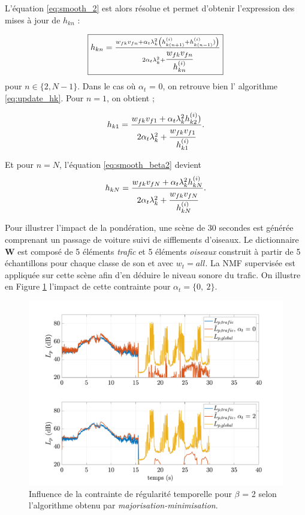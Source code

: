 L'équation \ref{eq:smooth_2} est alors résolue et permet d'obtenir l'expression des mises à jour de $h_{kn}$ : 

\begin{equation}\label{eq:smooth_beta2}
\fbox{$
h_{kn} = \frac{w_{fk} v_{fn}+\alpha_t  \lambda_k^2 \left(h_{k(n+1)}^{(i)}+h_{k(n-1)}^{(i)})\right)}{2\alpha_t \lambda_k^2 + \cfrac{w_{fk} v_{fn}} {h_{kn}^{(i)}}}$}
\end{equation}
pour $n \in \lbrace 2, N-1 \rbrace$. Dans le cas où $\alpha_t$ = 0, on retrouve bien l' algorithme \ref{eq:update_hk}. Pour $n = 1$, on obtient ; 

\begin{equation}
h_{k1} = \frac{w_{fk} v_{f1}+\alpha_t \lambda_k^2 h_{k2}^{(i)})}{2\alpha_t \lambda_k^2 + \cfrac{w_{fk} v_{f1}}{h_{k1}^{(i)}}}.
\end{equation}

Et pour $n = N$, l'équation \ref{eq:smooth_beta2} devient 
\begin{equation}
h_{kN} = \frac{w_{fk} v_{fN}+\alpha_t  \lambda_k^2 h_{kN}^{(i)}}{2\alpha_t \lambda_k^2 + \cfrac{w_{fk} v_{fN}} {h_{kN}^{(i)}}}.
\end{equation}

Pour illustrer l'impact de la pondération, une scène de 30 secondes est générée comprenant un passage de voiture suivi de sifflements d'oiseaux. Le dictionnaire $\mathbf{W}$ est composé de 5 éléments \textit{trafic} et 5 éléments \textit{oiseaux} construit à partir de 5 échantillons pour chaque classe de son et avec $w_t = all$. La NMF supervisée est appliquée sur cette scène afin d'en déduire le niveau sonore du trafic. On illustre en Figure \ref{fig:smooth_2} l'impact de cette contrainte pour $\alpha_t = \lbrace 0,~2\rbrace$. 

\begin{figure}[h]
\centering
\includegraphics[width=.9\linewidth]{./figures/NMF/LpSmooth_2.pdf}
\caption{Influence de la contrainte de régularité temporelle pour $\beta$ = 2 selon l'algorithme obtenu par \textit{majorisation-minimisation}.}
\label{fig:smooth_2}
\end{figure}


